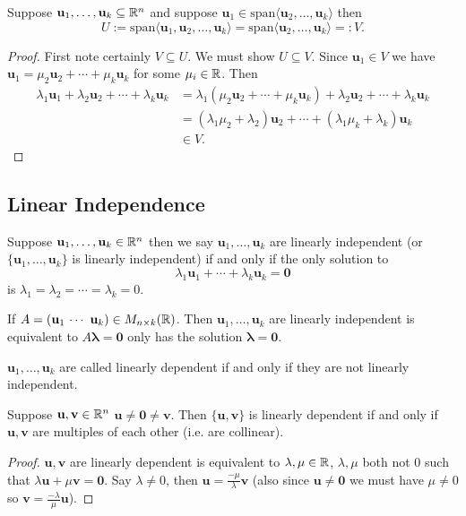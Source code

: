 \documentclass[10pt, a4paper]{article}
\newcommand{\mbf}[1]{\mathbf{#1}}
\begin{document}
\begin{lemma}
    Suppose $\mbf{u}_1, \dotsc, \mbf{u}_k \subseteq \R ^ n$ and suppose $\mbf{u}_1 \in \mathrm{span}\langle\mbf{u}_2, \dotsc, \mbf{u}_k\rangle$ then
    \[
    U := \mathrm{span}\langle\mbf{u}_1, \mbf{u}_2, \dotsc, \mbf{u}_k\rangle = \mathrm{span}\langle\mbf{u}_2, \dotsc, \mbf{u}_k\rangle =: V.
    \]
    \begin{proof}
        First note certainly $V \subseteq U$.
        We must show $U \subseteq V$.
        Since $\mbf{u}_1 \in V$ we have $\mbf{u}_1 = \mu_2\mbf{u}_2 + \dotsi + \mu_k\mbf{u}_k$ for some $\mu_i \in \mathbb{R}$.
        Then
        \begin{align*}
        \lambda_1\mbf{u}_1 + \lambda_2\mbf{u}_2 + \dotsi + \lambda_k\mbf{u}_k &= \lambda_1(\mu_2\mbf{u}_2 + \dotsi + \mu_k\mbf{u}_k) + \lambda_2\mbf{u}_2 + \dotsi + \lambda_k \mbf{u}_k \\
        &= (\lambda_1\mu_2 + \lambda_2)\mbf{u}_2 + \dotsi + (\lambda_1\mu_k + \lambda_k)\mbf{u}_k \\
        &\in V.
        \end{align*}
    \end{proof}
\end{lemma}

\subsection{Linear Independence}

\begin{definition}
    Suppose $\mbf{u}_1, \dotsc, \mbf{u}_k \in \R ^ n$ then we say $\mbf{u}_1, \dotsc, \mbf{u}_k$ are linearly independent
    (or $\{\mbf{u}_1, \dotsc, \mbf{u}_k\}$ is linearly independent)
    if and only if the only solution to
    \[
    \lambda_1\mbf{u}_1 + \dotsi + \lambda_k\mbf{u}_k = \mbf{0}
    \]
    is $\lambda_1 = \lambda_2 = \dotsi = \lambda_k = 0$.
\end{definition}

If $A = (\mbf{u}_1 \ \dotsi \ \mbf{u}_k) \in M_{n \times k}(\R)$.
Then $\mbf{u}_1, \dotsc, \mbf{u}_k$ are linearly independent is equivalent to $A\pmb{\lambda} = \mbf{0}$ only has the solution $\mbf{\lambda = 0}$.

\begin{definition}
    $\mbf{u}_1, \dotsc, \mbf{u}_k$ are called linearly dependent if and only if they are not linearly independent.
\end{definition}

\begin{example}
    Suppose $\mbf{u, v} \in \R ^ n$
    $\mbf{u \neq 0 \neq v}$.
    Then $\{\mbf{u, v}\}$ is linearly dependent if and only if $\mbf{u, v}$ are multiples of each other (i.e. are collinear).
    \begin{proof}
        $\mbf{u, v}$ are linearly dependent is equivalent to $\lambda, \mu \in \mathbb{R}$, $\lambda, \mu$ both not $0$ such that $\lambda\mbf{u} + \mu\mbf{v} = \mbf{0}$.
        Say $\lambda \neq 0$,
        then
        $\mbf{u} = \frac{-\mu}{\lambda}\mbf{v}$
        (also since $\mbf{u \neq 0}$ we must have $\mu \neq 0$ so $\mbf{v} = \frac{-\lambda}{\mu}\mbf{u}$).
    \end{proof}
\end{example}
\end{document}
